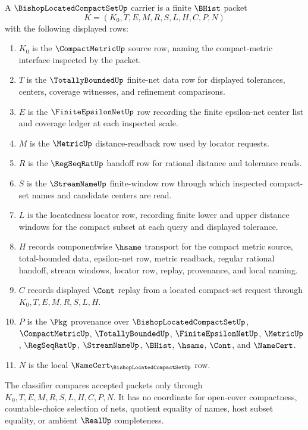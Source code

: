 \begin{definition}
\label{def:bishop-located-compact-set-carrier}
A $\BishopLocatedCompactSetUp$ carrier is a finite $\BHist$ packet
$$
K=(K_0,T,E,M,R,S,L,H,C,P,N)
$$
with the following displayed rows:
\begin{enumerate}
\item $K_0$ is the $\CompactMetricUp$ source row, naming the compact-metric interface inspected by the packet.
\item $T$ is the $\TotallyBoundedUp$ finite-net data row for displayed tolerances, centers, coverage witnesses, and refinement comparisons.
\item $E$ is the $\FiniteEpsilonNetUp$ row recording the finite epsilon-net center list and coverage ledger at each inspected scale.
\item $M$ is the $\MetricUp$ distance-readback row used by locator requests.
\item $R$ is the $\RegSeqRatUp$ handoff row for rational distance and tolerance reads.
\item $S$ is the $\StreamNameUp$ finite-window row through which inspected compact-set names and candidate centers are read.
\item $L$ is the locatedness locator row, recording finite lower and upper distance windows for the compact subset at each query and displayed tolerance.
\item $H$ records componentwise $\hsame$ transport for the compact metric source, total-bounded data, epsilon-net row, metric readback, regular rational handoff, stream windows, locator row, replay, provenance, and local naming.
\item $C$ records displayed $\Cont$ replay from a located compact-set request through $K_0,T,E,M,R,S,L,H$.
\item $P$ is the $\Pkg$ provenance over $\BishopLocatedCompactSetUp$, $\CompactMetricUp$, $\TotallyBoundedUp$, $\FiniteEpsilonNetUp$, $\MetricUp$, $\RegSeqRatUp$, $\StreamNameUp$, $\BHist$, $\hsame$, $\Cont$, and $\NameCert$.
\item $N$ is the local $\NameCert_{\BishopLocatedCompactSetUp}$ row.
\end{enumerate}
The classifier compares accepted packets only through $K_0,T,E,M,R,S,L,H,C,P,N$. It has no coordinate for open-cover compactness, countable-choice selection of nets, quotient equality of names, host subset equality, or ambient $\RealUp$ completeness.
\end{definition}


